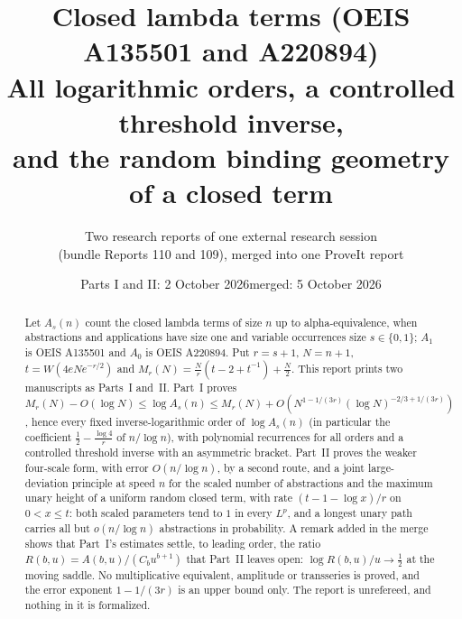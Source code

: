 \documentclass[11pt,a4paper]{article}
\title{\textbf{Closed lambda terms (OEIS A135501 and A220894)}\\[7pt]
\large All logarithmic orders, a controlled threshold inverse,\\ and the random binding geometry of a closed term}
\author{Two research reports of one external research session\\(bundle Reports 110 and 109), merged into one ProveIt report}
\date{Parts I and II: 2 October 2026\quad merged: 5 October 2026}
\numberwithin{equation}{section}
\theoremstyle{remark}
\begin{document}
\hypersetup{pageanchor=false}
\maketitle
\begin{abstract}
Let $A_s(n)$ count the closed lambda terms of size $n$ up to alpha-equivalence, when abstractions and applications have size one and variable occurrences size $s\in\{0,1\}$; $A_1$ is OEIS A135501 and $A_0$ is OEIS A220894. Put $r=s+1$, $N=n+1$, $t=W(4eNe^{-r/2})$ and $M_r(N)=\frac Nr(t-2+t^{-1})+\frac N2$. This report prints two manuscripts as Parts~I and~II. Part~I proves
$M_r(N)-O(\log N)\le\log A_s(n)\le M_r(N)+O(N^{1-1/(3r)}(\log N)^{-2/3+1/(3r)})$,
hence every fixed inverse-logarithmic order of $\log A_s(n)$ (in particular the coefficient $\frac12-\frac{\log4}r$ of $n/\log n$), with polynomial recurrences for all orders and a controlled threshold inverse with an asymmetric bracket. Part~II proves the weaker four-scale form, with error $O(n/\log n)$, by a second route, and a joint large-deviation principle at speed $n$ for the scaled number of abstractions and the maximum unary height of a uniform random closed term, with rate $(t-1-\log x)/r$ on $0<x\le t$: both scaled parameters tend to $1$ in every $L^p$, and a longest unary path carries all but $o(n/\log n)$ abstractions in probability. A remark added in the merge shows that Part~I's estimates settle, to leading order, the ratio $R(b,u)=A(b,u)/(C_bu^{b+1})$ that Part~II leaves open: $\log R(b,u)/u\to\frac12$ at the moving saddle. No multiplicative equivalent, amplitude or transseries is proved, and the error exponent $1-1/(3r)$ is an upper bound only. The report is unrefereed, and nothing in it is formalized.
\end{abstract}
\hypersetup{pageanchor=true}
\setcounter{tocdepth}{1}
\tableofcontents
\newpage
\end{document}
